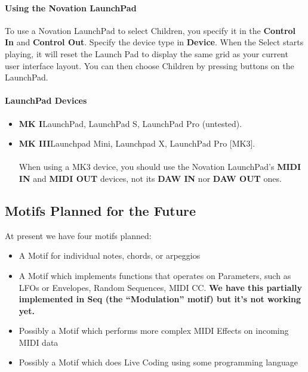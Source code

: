 \documentclass[twoside,10pt]{article}
\begin{document}
\paragraph{Using the Novation LaunchPad}

To use a Novation LaunchPad to select Children, you specify it in the {\bf Control In} and {\bf Control Out}.  Specify the device type in {\bf Device}.  When the Select starts playing, it will reset the Launch Pad to display the same grid as your current user interface layout.  You can then choose Children by pressing buttons on the LaunchPad.

\paragraph{LaunchPad Devices}

\begin{itemize}
\item {\bf MK I}\qquad LaunchPad, LaunchPad S, LaunchPad Pro (untested).   
\item {\bf MK III}\qquad Launchpad Mini, Launchpad X, LaunchPad Pro [MK3].\\\\When using a MK3 device, you should use the Novation LaunchPad's {\bf MIDI IN} and {\bf MIDI OUT} devices, not its {\bf DAW IN} nor {\bf DAW OUT} ones.  

\end{itemize}





\clearpage\subsection{Motifs Planned for the Future}

At present we have four motifs planned:

\begin{itemize}
\item A Motif for individual notes, chords, or arpeggios
\item A Motif which implements functions that operates on Parameters, such as LFOs or Envelopes, Random Sequences, MIDI CC.  {\bf \color{red} We have this partially implemented in Seq (the ``Modulation'' motif) but it's not working yet.}
\item Possibly a Motif which performs more complex MIDI Effects on incoming MIDI data
\item Possibly a Motif which does Live Coding using some programming language
\end{itemize}
\end{document}
